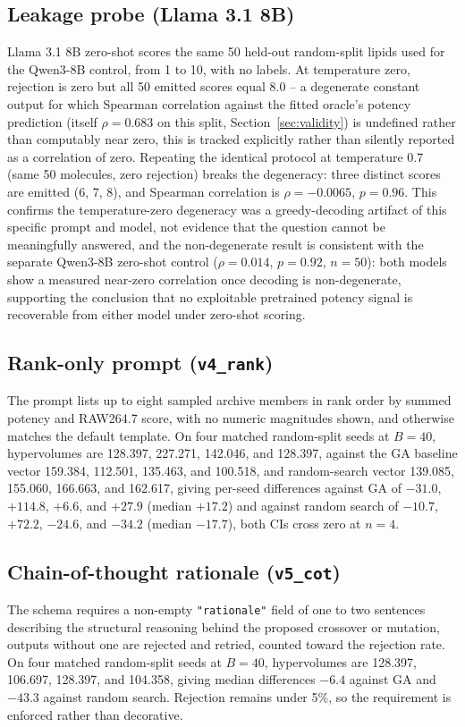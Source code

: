 \subsection{Leakage probe (Llama 3.1 8B)}
Llama 3.1 8B zero-shot scores the same 50 held-out random-split lipids used for the Qwen3-8B control, from 1 to 10, with no labels. At temperature zero, rejection is zero but all 50 emitted scores equal 8.0 -- a degenerate constant output for which Spearman correlation against the fitted oracle's potency prediction (itself $\rho=0.683$ on this split, Section~\ref{sec:validity}) is undefined rather than computably near zero, this is tracked explicitly rather than silently reported as a correlation of zero. Repeating the identical protocol at temperature 0.7 (same 50 molecules, zero rejection) breaks the degeneracy: three distinct scores are emitted (6, 7, 8), and Spearman correlation is $\rho=-0.0065$, $p=0.96$. This confirms the temperature-zero degeneracy was a greedy-decoding artifact of this specific prompt and model, not evidence that the question cannot be meaningfully answered, and the non-degenerate result is consistent with the separate Qwen3-8B zero-shot control ($\rho=0.014$, $p=0.92$, $n=50$): both models show a measured near-zero correlation once decoding is non-degenerate, supporting the conclusion that no exploitable pretrained potency signal is recoverable from either model under zero-shot scoring.

\subsection{Rank-only prompt (\texttt{v4\_rank})}
\label{app:v4rank}
The prompt lists up to eight sampled archive members in rank order by summed potency and RAW264.7 score, with no numeric magnitudes shown, and otherwise matches the default template. On four matched random-split seeds at $B=40$, hypervolumes are 128.397, 227.271, 142.046, and 128.397, against the GA baseline vector 159.384, 112.501, 135.463, and 100.518, and random-search vector 139.085, 155.060, 166.663, and 162.617, giving per-seed differences against GA of $-31.0$, $+114.8$, $+6.6$, and $+27.9$ (median $+17.2$) and against random search of $-10.7$, $+72.2$, $-24.6$, and $-34.2$ (median $-17.7$), both CIs cross zero at $n=4$.

\subsection{Chain-of-thought rationale (\texttt{v5\_cot})}
\label{app:cot}
The schema requires a non-empty \texttt{"rationale"} field of one to two sentences describing the structural reasoning behind the proposed crossover or mutation, outputs without one are rejected and retried, counted toward the rejection rate. On four matched random-split seeds at $B=40$, hypervolumes are 128.397, 106.697, 128.397, and 104.358, giving median differences $-6.4$ against GA and $-43.3$ against random search. Rejection remains under 5\%, so the requirement is enforced rather than decorative.

